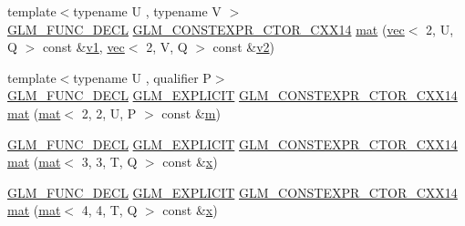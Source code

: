 \begin{DoxyCompactItemize}
\item 
{\footnotesize template$<$typename U , typename V $>$ }\\\hyperlink{setup_8hpp_ab2d052de21a70539923e9bcbf6e83a51}{G\+L\+M\+\_\+\+F\+U\+N\+C\+\_\+\+D\+E\+CL} \hyperlink{setup_8hpp_a0900f9145e68bf6061b6f5e7be3fa751}{G\+L\+M\+\_\+\+C\+O\+N\+S\+T\+E\+X\+P\+R\+\_\+\+C\+T\+O\+R\+\_\+\+C\+X\+X14} \hyperlink{structglm_1_1mat_3_012_00_012_00_01_t_00_01_q_01_4_a5bae47b291567292c6931d1fa10b5798}{mat} (\hyperlink{structglm_1_1vec}{vec}$<$ 2, U, Q $>$ const \&\hyperlink{_s_d_l__opengl__glext_8h_a435c176a02c061b43e19bdf7c86cceae}{v1}, \hyperlink{structglm_1_1vec}{vec}$<$ 2, V, Q $>$ const \&\hyperlink{_s_d_l__opengl__glext_8h_a0928f6d0f0f794ba000a21dfae422136}{v2})
\item 
{\footnotesize template$<$typename U , qualifier P$>$ }\\\hyperlink{setup_8hpp_ab2d052de21a70539923e9bcbf6e83a51}{G\+L\+M\+\_\+\+F\+U\+N\+C\+\_\+\+D\+E\+CL} \hyperlink{setup_8hpp_a6c74f5a5e7b134ab69023ff9a30d4d5d}{G\+L\+M\+\_\+\+E\+X\+P\+L\+I\+C\+IT} \hyperlink{setup_8hpp_a0900f9145e68bf6061b6f5e7be3fa751}{G\+L\+M\+\_\+\+C\+O\+N\+S\+T\+E\+X\+P\+R\+\_\+\+C\+T\+O\+R\+\_\+\+C\+X\+X14} \hyperlink{structglm_1_1mat_3_012_00_012_00_01_t_00_01_q_01_4_a5957fcd6239f1897d7538031ce3b2f0d}{mat} (\hyperlink{structglm_1_1mat}{mat}$<$ 2, 2, U, P $>$ const \&\hyperlink{_s_d_l__opengl__glext_8h_af593500c283bf1a787a6f947f503a5c2}{m})
\item 
\hyperlink{setup_8hpp_ab2d052de21a70539923e9bcbf6e83a51}{G\+L\+M\+\_\+\+F\+U\+N\+C\+\_\+\+D\+E\+CL} \hyperlink{setup_8hpp_a6c74f5a5e7b134ab69023ff9a30d4d5d}{G\+L\+M\+\_\+\+E\+X\+P\+L\+I\+C\+IT} \hyperlink{setup_8hpp_a0900f9145e68bf6061b6f5e7be3fa751}{G\+L\+M\+\_\+\+C\+O\+N\+S\+T\+E\+X\+P\+R\+\_\+\+C\+T\+O\+R\+\_\+\+C\+X\+X14} \hyperlink{structglm_1_1mat_3_012_00_012_00_01_t_00_01_q_01_4_a682cca2c732533360d904d912f4c69e8}{mat} (\hyperlink{structglm_1_1mat}{mat}$<$ 3, 3, T, Q $>$ const \&\hyperlink{_s_d_l__opengl_8h_ad0e63d0edcdbd3d79554076bf309fd47}{x})
\item 
\hyperlink{setup_8hpp_ab2d052de21a70539923e9bcbf6e83a51}{G\+L\+M\+\_\+\+F\+U\+N\+C\+\_\+\+D\+E\+CL} \hyperlink{setup_8hpp_a6c74f5a5e7b134ab69023ff9a30d4d5d}{G\+L\+M\+\_\+\+E\+X\+P\+L\+I\+C\+IT} \hyperlink{setup_8hpp_a0900f9145e68bf6061b6f5e7be3fa751}{G\+L\+M\+\_\+\+C\+O\+N\+S\+T\+E\+X\+P\+R\+\_\+\+C\+T\+O\+R\+\_\+\+C\+X\+X14} \hyperlink{structglm_1_1mat_3_012_00_012_00_01_t_00_01_q_01_4_a72c0e5e462b5dd23b122288114549fc8}{mat} (\hyperlink{structglm_1_1mat}{mat}$<$ 4, 4, T, Q $>$ const \&\hyperlink{_s_d_l__opengl_8h_ad0e63d0edcdbd3d79554076bf309fd47}{x})

\end{DoxyCompactItemize}

